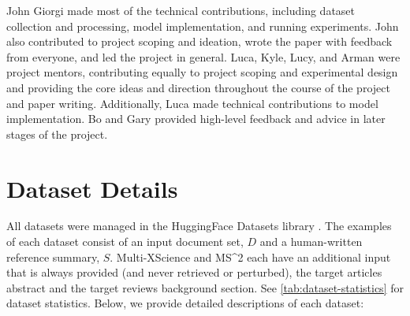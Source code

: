\documentclass[11pt]{article}
\newcommand\mstoo{{MS\^{}2}\xspace}
\begin{document}
John Giorgi made most of the technical contributions, including dataset collection and processing, model implementation, and running experiments. John also contributed to project scoping and ideation, wrote the paper with feedback from everyone, and led the project in general. Luca, Kyle, Lucy, and Arman were project mentors, contributing equally to project scoping and experimental design and providing the core ideas and direction throughout the course of the project and paper writing. Additionally, Luca made technical contributions to model implementation. Bo and Gary provided high-level feedback and advice in later stages of the project.




\appendix

\clearpage

\section{Dataset Details}
\label{appendix:dataset-details}

All datasets were managed in the HuggingFace Datasets library \citep{hf-datasets}. The examples of each dataset consist of an input document set, \(D\) and a human-written reference summary, \(S\). Multi-XScience and \mstoo each have an additional input that is always provided (and never retrieved or perturbed), the target articles abstract and the target reviews background section. See \autoref{tab:dataset-statistics} for dataset statistics. Below, we provide detailed descriptions of each dataset:
\end{document}
